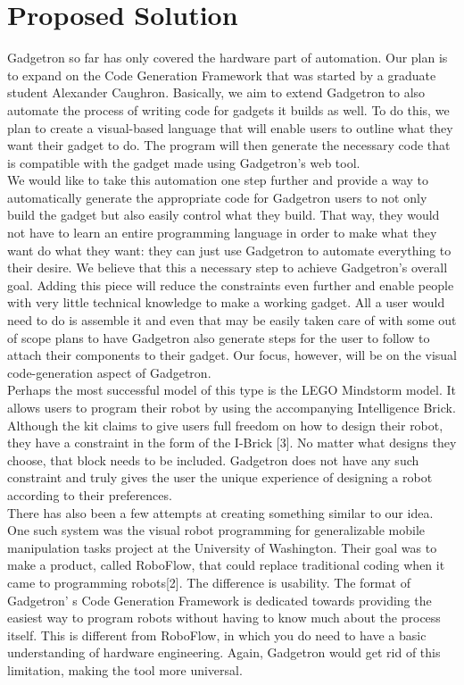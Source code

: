 \documentclass[12pt]{article}
\begin{document}
\section{Proposed Solution}
Gadgetron so far has only covered the hardware part of automation. Our plan is to expand on the Code Generation Framework that was started by a graduate student Alexander Caughron. Basically, we aim to extend Gadgetron to also automate the process of writing code for gadgets it builds as well. 
To do this, we plan to create a visual-based language that will enable users to outline what they want their gadget to do. The program will then generate the necessary code that is compatible with the gadget made using 
Gadgetron's web tool.\\[7pt] 
We would like to take this automation one step further and provide a way to automatically generate the appropriate code for Gadgetron users to not only build the gadget but also easily control what they build. That way, they would not have to learn an entire programming language in order to make what they want do what they want: they can just use Gadgetron to automate everything to their desire. We believe that this a necessary step to achieve Gadgetron's overall goal. Adding this piece will reduce the constraints even further and enable people with very little technical knowledge to make a working gadget. All a user would need to do is assemble it and even that may be easily taken care of with some out of scope plans to have Gadgetron also generate steps for the user to follow to attach their components to their gadget. Our focus, however, will be on the visual code-generation aspect of Gadgetron.\\[7pt]
Perhaps the most successful model of this type is the LEGO Mindstorm model. It allows users to program their robot by using the accompanying Intelligence Brick. Although the kit claims to give users full freedom on how to 
design their robot, they have a constraint in the form of the I-Brick [3]. No matter what designs they choose, that block needs to be included. Gadgetron does not have any such constraint and truly gives the user the unique 
experience of designing a robot according to their preferences.\\[7pt]
There has also been a few attempts at creating something similar to our idea. One such system was the visual robot programming for generalizable mobile manipulation tasks project at the University of Washington. Their goal 
was to make a product, called RoboFlow, that could replace traditional coding when it came to programming robots[2]. The difference is usability. The format of Gadgetron' s Code Generation Framework is dedicated towards
providing the easiest way to program robots without having to know much about the process itself. This is different from RoboFlow, in which you do need to have a basic understanding of hardware engineering. Again, Gadgetron would get rid of this limitation, making the tool more universal. 
\end{document}
